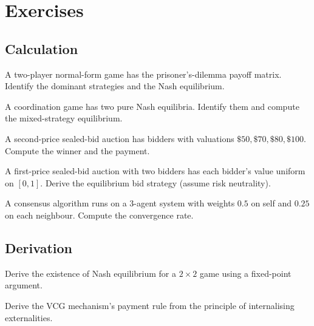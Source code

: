 \section{Exercises}

\subsection*{Calculation}

\begin{exercise}
A two-player normal-form game has the prisoner's-dilemma payoff matrix. Identify the dominant strategies and the Nash equilibrium.
\end{exercise}

\begin{exercise}
A coordination game has two pure Nash equilibria. Identify them and compute the mixed-strategy equilibrium.
\end{exercise}

\begin{exercise}
A second-price sealed-bid auction has bidders with valuations $\$50, \$70, \$80, \$100$. Compute the winner and the payment.
\end{exercise}

\begin{exercise}
A first-price sealed-bid auction with two bidders has each bidder's value uniform on $[0, 1]$. Derive the equilibrium bid strategy (assume risk neutrality).
\end{exercise}

\begin{exercise}
A consensus algorithm runs on a 3-agent system with weights $0.5$ on self and $0.25$ on each neighbour. Compute the convergence rate.
\end{exercise}

\subsection*{Derivation}

\begin{exercise}
Derive the existence of Nash equilibrium for a $2 \times 2$ game using a fixed-point argument.
\end{exercise}

\begin{exercise}
Derive the VCG mechanism's payment rule from the principle of internalising externalities.
\end{exercise}

